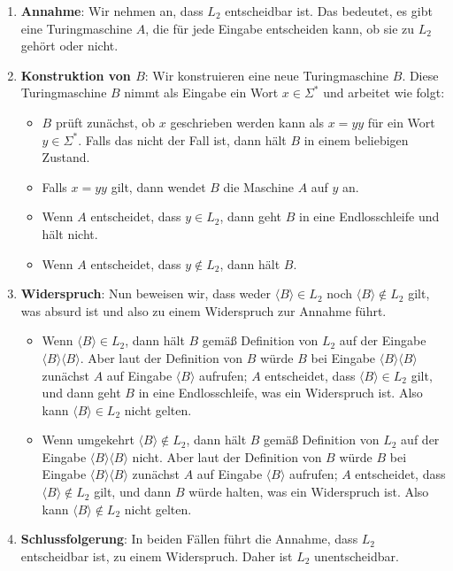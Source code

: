 \documentclass[a4paper,11pt,oneside,ngerman]{scrartcl}
\begin{document}
\begin{enumerate}
    \item \textbf{Annahme}: Wir nehmen an, dass \( L_2 \) entscheidbar ist. Das bedeutet, es gibt eine Turingmaschine \( A \), die für jede Eingabe entscheiden kann, ob sie zu \( L_2 \) gehört oder nicht.
    
    \item \textbf{Konstruktion von \( B \)}: Wir konstruieren eine neue Turingmaschine \( B \). Diese Turingmaschine \( B \) nimmt als Eingabe ein Wort $x\in\Sigma^\ast$ und arbeitet wie folgt:
    \begin{itemize}
        \item \(B\) prüft zunächst, ob \(x\) geschrieben werden kann als \(x=yy\) für ein Wort \(y\in\Sigma^\ast\). Falls das nicht der Fall ist, dann hält \(B\) in einem beliebigen Zustand.
        \item Falls \(x=yy\) gilt, dann wendet \( B \) die Maschine \( A \) auf \( y \) an.
        \item Wenn \( A \) entscheidet, dass \( y \in L_2 \), dann geht \( B \) in eine Endlosschleife und hält nicht.
        \item Wenn \( A \) entscheidet, dass \( y \notin L_2 \), dann hält \( B \).
    \end{itemize}
    
    \item \textbf{Widerspruch}: Nun beweisen wir, dass weder \( \langle B \rangle\in L_2 \) noch \( \langle B \rangle\not\in L_2 \) gilt, was absurd ist und also zu einem Widerspruch zur Annahme führt.
    \begin{itemize}
        \item Wenn \( \langle B \rangle \in L_2 \), dann hält \( B \) gemäß Definition von \(L_2\) auf der Eingabe \( \langle B \rangle\langle B \rangle \). Aber laut der Definition von \( B \) würde \(B\) bei Eingabe \(\langle B \rangle\langle B \rangle\) zunächst \(A\) auf Eingabe \(\langle B \rangle\) aufrufen; \(A\) entscheidet, dass \(\langle B \rangle\in L_2\) gilt, und dann geht \(B\) in eine Endlosschleife, was ein Widerspruch ist. Also kann \( \langle B \rangle \in L_2 \) nicht gelten.
        \item Wenn umgekehrt \( \langle B \rangle \notin L_2 \), dann hält \( B \) gemäß Definition von \(L_2\) auf der Eingabe \( \langle B \rangle\langle B \rangle \) nicht. Aber laut der Definition von \( B \) würde \(B\) bei Eingabe \(\langle B \rangle\langle B \rangle\) zunächst \(A\) auf Eingabe \(\langle B \rangle\) aufrufen; \(A\) entscheidet, dass \(\langle B \rangle\not\in L_2\) gilt, und dann \(B\) würde halten, was ein Widerspruch ist. Also kann \( \langle B \rangle \not\in L_2 \) nicht gelten.
    \end{itemize}
    
    \item \textbf{Schlussfolgerung}: In beiden Fällen führt die Annahme, dass \( L_2 \) entscheidbar ist, zu einem Widerspruch. Daher ist \( L_2 \) unentscheidbar.
\end{enumerate}
\end{document}
